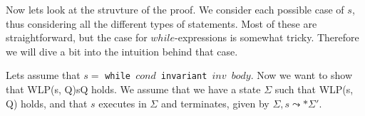 Now lets look at the struvture of the proof.
We consider each possible case of $s$, thus considering all the different types of statements.
Most of these are straightforward, but the case for $while$-expressions is somewhat tricky.
Therefore we will dive a bit into the intuition behind that case.

Lets assume that $s =$ \texttt{while $cond$ invariant $inv$ $body$}. Now we want to show that {WLP(s, Q)}s{Q} holds. We assume that we have a state $\Sigma$ such that {WLP(s, Q)} holds, and that $s$ executes in $\Sigma$ and terminates, given by $\Sigma, s \leadsto * \Sigma '$.
